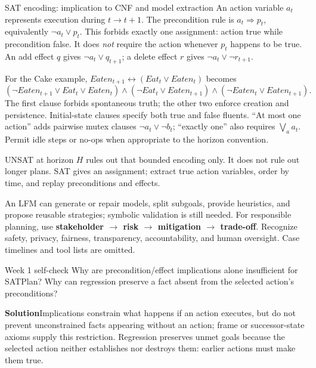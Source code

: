 \documentclass[10pt,a4paper]{article}
\newcommand{\ans}{\par\smallskip\textbf{\color{good}Solution\quad}}
\begin{document}
\begin{card}{SAT encoding: implication to CNF and model extraction}
An action variable $a_t$ represents execution during $t\to t+1$. The precondition rule is $a_t\Rightarrow p_t$, equivalently $\neg a_t\lor p_t$. This forbids exactly one assignment: action true while precondition false. It does \emph{not} require the action whenever $p_t$ happens to be true. An add effect $q$ gives $\neg a_t\lor q_{t+1}$; a delete effect $r$ gives $\neg a_t\lor\neg r_{t+1}$.

For the Cake example, $Eaten_{t+1}\leftrightarrow(Eat_t\lor Eaten_t)$ becomes
\[
(\neg Eaten_{t+1}\lor Eat_t\lor Eaten_t)
\land(\neg Eat_t\lor Eaten_{t+1})
\land(\neg Eaten_t\lor Eaten_{t+1}).
\]
The first clause forbids spontaneous truth; the other two enforce creation and persistence. Initial-state clauses specify both true and false fluents. ``At most one action'' adds pairwise mutex clauses $\neg a_t\lor\neg b_t$; ``exactly one'' also requires $\bigvee_a a_t$. Permit idle steps or no-ops when appropriate to the horizon convention.

UNSAT at horizon $H$ rules out that bounded encoding only. It does not rule out longer plans. SAT gives an assignment; extract true action variables, order by time, and replay preconditions and effects.
\end{card}

\begin{note}
An LFM can generate or repair models, split subgoals, provide heuristics, and propose reusable strategies; symbolic validation is still needed. For responsible planning, use \textbf{stakeholder $\to$ risk $\to$ mitigation $\to$ trade-off}. Recognize safety, privacy, fairness, transparency, accountability, and human oversight. Case timelines and tool lists are omitted.
\end{note}

\begin{question}{Week 1 self-check}
Why are precondition/effect implications alone insufficient for SATPlan? Why can regression preserve a fact absent from the selected action's preconditions?
\ans Implications constrain what happens if an action executes, but do not prevent unconstrained facts appearing without an action; frame or successor-state axioms supply this restriction. Regression preserves unmet goals because the selected action neither establishes nor destroys them: earlier actions must make them true.
\end{question}
\end{document}
